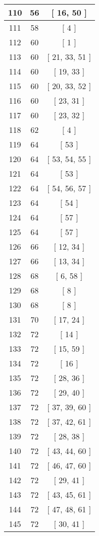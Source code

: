 \begin{center}
\begin{longtable}[H]{|| c c c ||}
\hline
110 & 56 & [ 16, 50 ] \\ 
\hline
111 & 58 & [ 4 ] \\ 
\hline
112 & 60 & [ 1 ] \\ 
\hline
113 & 60 & [ 21, 33, 51 ] \\ 
\hline
114 & 60 & [ 19, 33 ] \\ 
\hline
115 & 60 & [ 20, 33, 52 ] \\ 
\hline
116 & 60 & [ 23, 31 ] \\ 
\hline
117 & 60 & [ 23, 32 ] \\ 
\hline
118 & 62 & [ 4 ] \\ 
\hline
119 & 64 & [ 53 ] \\ 
\hline
120 & 64 & [ 53, 54, 55 ] \\ 
\hline
121 & 64 & [ 53 ] \\ 
\hline
122 & 64 & [ 54, 56, 57 ] \\ 
\hline
123 & 64 & [ 54 ] \\ 
\hline
124 & 64 & [ 57 ] \\ 
\hline
125 & 64 & [ 57 ] \\ 
\hline
126 & 66 & [ 12, 34 ] \\ 
\hline
127 & 66 & [ 13, 34 ] \\ 
\hline
128 & 68 & [ 6, 58 ] \\ 
\hline
129 & 68 & [ 8 ] \\ 
\hline
130 & 68 & [ 8 ] \\ 
\hline
131 & 70 & [ 17, 24 ] \\ 
\hline
132 & 72 & [ 14 ] \\ 
\hline
133 & 72 & [ 15, 59 ] \\ 
\hline
134 & 72 & [ 16 ] \\ 
\hline
135 & 72 & [ 28, 36 ] \\ 
\hline
136 & 72 & [ 29, 40 ] \\ 
\hline
137 & 72 & [ 37, 39, 60 ] \\ 
\hline
138 & 72 & [ 37, 42, 61 ] \\ 
\hline
139 & 72 & [ 28, 38 ] \\ 
\hline
140 & 72 & [ 43, 44, 60 ] \\ 
\hline
141 & 72 & [ 46, 47, 60 ] \\ 
\hline
142 & 72 & [ 29, 41 ] \\ 
\hline
143 & 72 & [ 43, 45, 61 ] \\ 
\hline
144 & 72 & [ 47, 48, 61 ] \\ 
\hline
145 & 72 & [ 30, 41 ] \\ 

\end{longtable}
\end{center}

